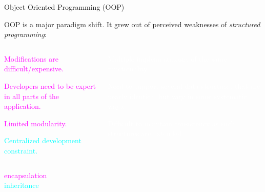 \documentclass[11pt]{beamer}
\newcommand{\bi}{\begin{itemize}}
\newcommand{\ei}{\end{itemize}}
\begin{document}

\begin{frame}{Object Oriented Programming (OOP)}

OOP is a major paradigm shift. It grew out of perceived weaknesses of \emph{structured programming}:
\begin{columns}[onlytextwidth,t]
  \begin{column}{0.48\textwidth}
  \bi
  \item \textcolor{magenta}{Modifications are difficult/expensive.
  \item Developers need to be expert in all parts of the application.
  \item Limited modularity.}
  \item \textcolor{cyan}{Centralized development constraint.}

  \ei
  \end{column}
  \begin{column}{0.48\textwidth}
  \bi
  \item [\textcolor{white}{\textbullet}] \textcolor{white}{Multiple implementations of the same functionality.}

  \item [\textcolor{white}{\textbullet}] \textcolor{white}{Need to support several data structures that are nearly identical but vary in some systematic ways.
\item [\textcolor{white}{\textbullet}] Difficult to maintain consistency as such structures are extended.}

  \ei

  \end{column}
\end{columns}

  \vfill
  \scriptsize{
\quad \quad \quad \textcolor{magenta}{encapsulation}\\
\quad \quad \quad \textcolor{cyan}{inheritance}
}

\end{frame}
\end{document}
